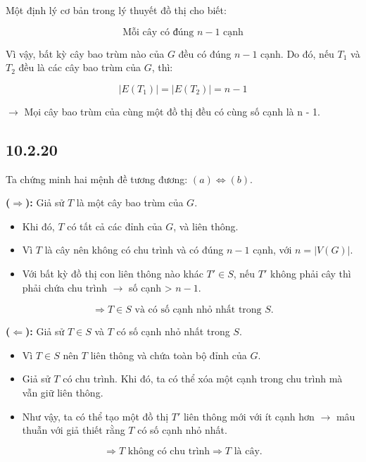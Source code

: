 \documentclass{article}
\begin{document}
	Một định lý cơ bản trong lý thuyết đồ thị cho biết:
	
	\[
	\boxed{\text{Mỗi cây có đúng } n - 1 \text{ cạnh}}
	\]
	
	Vì vậy, bất kỳ cây bao trùm nào của $G$ đều có đúng $n - 1$ cạnh.  
	Do đó, nếu $T_1$ và $T_2$ đều là các cây bao trùm của $G$, thì:
	
	\[
	|E(T_1)| = |E(T_2)| = n - 1
	\]
	
	$\rightarrow$ Mọi cây bao trùm của cùng một đồ thị đều có cùng số cạnh là n - 1.
	
	\subsection*{10.2.20}
	Ta chứng minh hai mệnh đề tương đương: $(a) \Leftrightarrow (b)$.
	
	\vspace{0.5em}
	\noindent \textbf{($\Rightarrow$):} Giả sử $T$ là một cây bao trùm của $G$.
	
	\begin{itemize}
		\item Khi đó, $T$ có tất cả các đỉnh của $G$, và liên thông.
		\item Vì $T$ là cây nên không có chu trình và có đúng $n - 1$ cạnh, với $n = |V(G)|$.
		\item Với bất kỳ đồ thị con liên thông nào khác $T' \in S$, nếu $T'$ không phải cây thì phải chứa chu trình $\rightarrow$ số cạnh > $n - 1$.
	\end{itemize}
	
	\[
	\Rightarrow T \in S \text{ và có số cạnh nhỏ nhất trong } S.
	\]
	
	\vspace{0.5em}
	\noindent \textbf{($\Leftarrow$):} Giả sử $T \in S$ và $T$ có số cạnh nhỏ nhất trong $S$.
	
	\begin{itemize}
		\item Vì $T \in S$ nên $T$ liên thông và chứa toàn bộ đỉnh của $G$.
		\item Giả sử $T$ có chu trình. Khi đó, ta có thể xóa một cạnh trong chu trình mà vẫn giữ liên thông.
		\item Như vậy, ta có thể tạo một đồ thị $T'$ liên thông mới với ít cạnh hơn $\rightarrow$ mâu thuẫn với giả thiết rằng $T$ có số cạnh nhỏ nhất.
	\end{itemize}
	
	\[
	\Rightarrow T \text{ không có chu trình} \Rightarrow T \text{ là cây}.
	\]
	
\end{document}
